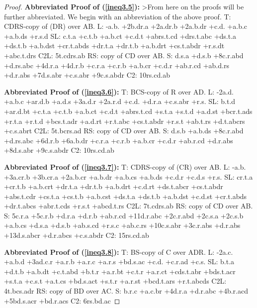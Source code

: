 \documentclass[10pt,journal]{IEEEtran}
\begin{document}
\begin{proof}
{\bf Abbreviated Proof of (\ref{ineq3.5}):}
>From here on the proofs will be further abbreviated.  We begin with an abbreviation of the above proof.\newline
T: CDRS-copy of (DR) over AB.\newline
L: -a.b. +2b.dr.a +2a.dr.b +2a.b.dr +c.d. +a.b.c +a.b.ds +r.s.d\newline
SL: c.t.a +c.t.b +a.b.ct +c.d.t +abrs.t.cd +drs.t.abc +ds.t.a +ds.t.b +a.b.dst +cr.t.abds +dr.t.a +dr.t.b +a.b.drt +cs.t.abdr +r.s.dt +abc.t.drs
C2L: 5t.cdrs.ab\newline
RS:
copy of CD over AB.\newline
S: d.s.a +d.s.b +8c.r.abd +d.rs.abc +4d.r.a +4d.r.b +c.r.a +c.r.b +a.b.cr +c.d.r +ab.r.cd +ab.d.rs +d.r.abs +7d.s.abr +c.s.abr +9c.s.abdr
C2: 10rs.cd.ab\newline


{\bf Abbreviated Proof of (\ref{ineq3.6}):}
T: BCS-copy of R over AD.\newline
L: -2a.d. +a.b.c +ar.d.b +a.d.s +3a.d.r +2a.r.d +c.d. +d.r.a +c.s.abr +r.s.\newline
SL: b.t.d +ar.d.bt +c.t.a +c.t.b +a.b.ct +c.d.t +abrs.t.cd +s.t.a +s.t.d +a.d.st +bcr.t.ads +r.t.a +r.t.d +bcs.t.adr +a.d.rt +r.t.abc +cs.t.abdr +r.s.t +ab.t.rs +d.t.abcrs +c.s.abrt
C2L: 5t.bcrs.ad\newline
RS:
copy of CD over AB.\newline
S: d.s.b +a.b.ds +8c.r.abd +d.rs.abc +6d.r.b +6a.b.dr +c.r.a +c.r.b +a.b.cr +c.d.r +ab.r.cd +d.r.abs +8d.s.abr +9c.s.abdr
C2: 10rs.cd.ab\newline


{\bf Abbreviated Proof of (\ref{ineq3.7}):}
T: CDRS-copy of (CR) over AB.\newline
L: -a.b. +3a.cr.b +3b.cr.a +2a.b.cr +a.b.dr +a.b.cs +a.b.ds +c.d.r +c.d.s +r.s.\newline
SL: cr.t.a +cr.t.b +a.b.crt +dr.t.a +dr.t.b +a.b.drt +c.d.rt +ds.t.abcr +cs.t.abdr +abs.t.cdr +cs.t.a +cs.t.b +a.b.cst +ds.t.a +ds.t.b +a.b.dst +c.d.st +cr.t.abds +dr.t.abcs +abr.t.cds +r.s.t +abcd.t.rs
C2L: 7t.cdrs.ab\newline
RS:
copy of CD over AB.\newline
S: 5c.r.a +5c.r.b +d.r.a +d.r.b +ab.r.cd +11d.r.abc +2c.r.abd +2c.s.a +2c.s.b +a.b.cs +d.s.a +d.s.b +ab.s.cd +r.s.c +ab.c.rs +10c.s.abr +3c.r.abs +d.r.abs +13d.s.abcr +d.r.abcs +c.s.abdr
C2: 15rs.cd.ab\newline


{\bf Abbreviated Proof of (\ref{ineq3.8}):}
T: BS-copy of C over ADR.\newline
L: -2a.c. +a.b.d +3ad.c.r +a.r.b +a.r.c +a.r.s +bd.s.ac +c.d. +c.r.ad +c.s.\newline
SL: b.t.a +d.t.b +a.b.dt +c.t.abd +b.t.r +a.r.bt +c.t.r +a.r.ct +cds.t.abr +bds.t.acr +s.t.a +c.s.t +a.t.cs +bd.s.act +s.t.r +a.r.st +bcd.t.ars +r.t.abcds
C2L: 4t.bcs.adr\newline
RS:
copy of BD over AC.\newline
S: b.r.c +a.c.br +4d.r.a +d.r.abc +4b.r.acd +5bd.s.acr +bd.r.acs
C2: 6rs.bd.ac\newline


\end{proof}
\end{document}
